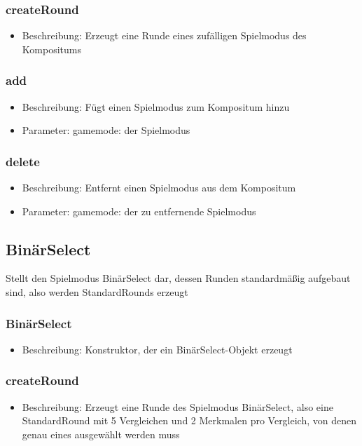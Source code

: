 \documentclass[a4paper]{scrreprt}
\begin{document}
	\subsubsection{createRound}
	\begin{itemize}
		\item Beschreibung: Erzeugt eine Runde eines zufälligen Spielmodus des Kompositums
	\end{itemize}
	\subsubsection{add}
	\begin{itemize}
		\item Beschreibung: Fügt einen Spielmodus zum Kompositum hinzu
		\item Parameter: gamemode: der Spielmodus
	\end{itemize}
	\subsubsection{delete}
	\begin{itemize}
		\item Beschreibung: Entfernt einen Spielmodus aus dem Kompositum
		\item Parameter: gamemode: der zu entfernende Spielmodus
	\end{itemize}

	\subsection{BinärSelect}
	Stellt den Spielmodus BinärSelect dar, dessen Runden standardmäßig aufgebaut sind, also werden StandardRounds erzeugt
	\subsubsection{BinärSelect}
	\begin{itemize}
		\item Beschreibung: Konstruktor, der ein BinärSelect-Objekt erzeugt
	\end{itemize}
	\subsubsection{createRound}
	\begin{itemize}
		\item Beschreibung: Erzeugt eine Runde des Spielmodus BinärSelect, also eine StandardRound mit 5 Vergleichen und 2 Merkmalen pro Vergleich, von denen genau eines ausgewählt werden muss
	\end{itemize}
\end{document}

